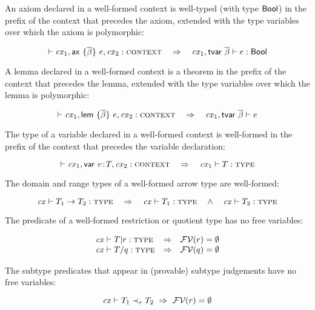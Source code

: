 An axiom declared in a well-formed context is well-typed (with type $\mathsf{Bool}$)
in the prefix of the context that precedes the axiom, extended with the type
variables over which the axiom is polymorphic:

\begin{theorem}\label{thm-ax-wt}
\[
\vdash\mathit{cx}_1,\mathsf{ax}\ \{\overline{\beta}\}\ e,\mathit{cx}_2:\textsc{context}\ \ \ \Rightarrow\ \ \
\mathit{cx}_1,\mathsf{tvar}\ \overline{\beta}\vdash e:\mathsf{Bool}
\]
\end{theorem}

A lemma declared in a well-formed context is a theorem in the prefix of the
context that precedes the lemma, extended with the type variables over which
the lemma is polymorphic:

\begin{theorem}\label{thm-lem-theo}
\[
\vdash\mathit{cx}_1,\mathsf{lem}\ \{\overline{\beta}\}\ e,\mathit{cx}_2:\textsc{context}\ \ \ \Rightarrow\ \ \
\mathit{cx}_1,\mathsf{tvar}\ \overline{\beta}\vdash e
\]
\end{theorem}

The type of a variable declared in a well-formed context is well-formed in the
prefix of the context that precedes the variable declaration:

\begin{theorem}\label{thm-var-type-wf}
\[
\cxwf{\cx_1,\vdecO,\cx_2}\ \ \IMPLIES\ \ \isty{\cx_1}{\typ}
\]
\end{theorem}

The domain and range types of a well-formed arrow type are well-formed:

\begin{theorem}\label{thm-tarr-inv}
\[
\istyO{\tarrO}\ \ \IMPLIES\ \ \istyO{\typ_1}\ \ \AND\ \ \istyO{\typ_2}
\]
\end{theorem}

The predicate of a well-formed restriction or quotient type has no free
variables:

\begin{theorem}\label{thm-no-free-vars-in-types}
\[
\begin{array}{l@{\ \ \IMPLIES\ \ }l}
\istyO{\tsubO}  & \efvar{\tspred}=\emptyset\\
\istyO{\tquotO} & \efvar{\tqpred}=\emptyset
\end{array}
\]
\end{theorem}

The subtype predicates that appear in (provable) subtype judgements have no
free variables:

\begin{theorem}\label{thm-subpred-no-free-vars}
\[
\mathit{cx}\vdash T_1\prec_{r}T_2\ \Rightarrow\ \mathcal{FV}(r)=\emptyset
\]
\end{theorem}

